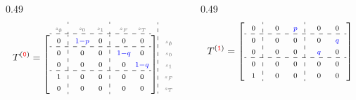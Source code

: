 \documentclass[aspectratio=169,11pt]{beamer}
\newcommand{\ecs}[1]{\makebox[1.85em]{\ensuremath{\scriptstyle#1}}}
\newcommand{\lcs}[1]{\makebox[1.85em]{\ensuremath{\scriptscriptstyle\color{black!55}#1}}}
\begin{document}
\begin{frame}
  \vspace{0.0em}
  \begin{columns}[c]
    \begin{column}{0.49\textwidth}
      \[
        T^{({\color{red}\mathtt{0}})} =
        \begin{array}{@{}c@{}}
          \begin{array}{@{}c@{}:c@{}c@{}:c@{}c@{}}
            \lcs{s_\emptyset}&\lcs{s_0}&\lcs{s_1}&\lcs{s_F}&\lcs{s_T}\\\hdashline\end{array}\\[0.1em]
          \left[\begin{array}{@{}c@{}:c@{}c@{}:c@{}c@{}}
            \ecs{0}&\ecs{\color{blue}1-p}&\ecs{0}&\ecs{0}&\ecs{0}\\\hdashline
            \ecs{0}&\ecs{0}&\ecs{0}&\ecs{\color{blue}1-q}&\ecs{0}\\
            \ecs{0}&\ecs{0}&\ecs{0}&\ecs{0}&\ecs{\color{blue}1-q}\\\hdashline
            \ecs{1}&\ecs{0}&\ecs{0}&\ecs{0}&\ecs{0}\\
            \ecs{0}&\ecs{0}&\ecs{0}&\ecs{0}&\ecs{0}
          \end{array}\right]
        \end{array}
        \begin{array}{:@{\,}l@{}}\\[0.1em]
          \lcs{s_\emptyset}\\ \lcs{s_0}\\ \lcs{s_1}\\ \lcs{s_F}\\ \lcs{s_T}\end{array}
      \]
    \end{column}
    \begin{column}{0.49\textwidth}
      \[
        T^{({\color{red}\mathtt{1}})} =
        \left[\begin{array}{@{}c@{}:c@{}c@{}:c@{}c@{}}
          \ecs{0}&\ecs{0}&\ecs{\color{blue}p}&\ecs{0}&\ecs{0}\\\hdashline
          \ecs{0}&\ecs{0}&\ecs{0}&\ecs{0}&\ecs{\color{blue}q}\\
          \ecs{0}&\ecs{0}&\ecs{0}&\ecs{\color{blue}q}&\ecs{0}\\\hdashline
          \ecs{0}&\ecs{0}&\ecs{0}&\ecs{0}&\ecs{0}\\
          \ecs{1}&\ecs{0}&\ecs{0}&\ecs{0}&\ecs{0}
        \end{array}\right]
      \]
    \end{column}
  \end{columns}
\end{frame}
\end{document}
